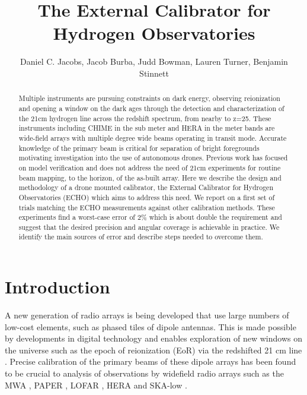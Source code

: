 \documentclass[preprint2,numberedappendix,tighten,twocolappendix]{aastex6}
\begin{document}
\title{The External Calibrator for Hydrogen Observatories}



\author{
Daniel C. Jacobs,
Jacob Burba,
Judd Bowman,
Lauren Turner,
Benjamin Stinnett
}



\begin{abstract}
Multiple instruments are pursuing constraints on dark energy, observing reionization and opening a window on the dark ages through the detection and characterization of the 21cm hydrogen line across the redshift spectrum, from nearby to z=25.  These instruments including CHIME in the sub meter and HERA in the meter bands are wide-field arrays with multiple degree wide beams operating in transit mode.  Accurate knowledge of the primary beam is critical for separation of bright foregrounds motivating investigation into the use of autonomous drones.  Previous work has focused on model verification and does not address the need of 21cm experiments for routine beam mapping, to the horizon, of the as-built array.  Here we describe the design and methodology of a drone mounted calibrator, the External Calibrator for Hydrogen Observatories (ECHO) which aims to address this need. We report on a first set of trials matching the ECHO measurements against other calibration methods.  These experiments find a worst-case error of 2\% which is about double the requirement and suggest that the desired precision and angular coverage is achievable in practice. We identify the main sources of error and describe steps needed to overcome them.
\end{abstract}




\section{Introduction}\label{sec:intro}

A new generation of radio arrays is being developed that use large numbers of low-cost elements, such as phased tiles of dipole antennas. This is made possible by developments in digital technology and enables exploration of new windows on the universe such as the epoch of reionization (EoR) via the redshifted 21 cm line \citep{Morales:2010p8093,Furlanetto:2006p2267,Madau:1997p2232}. Precise calibration of the primary beams of these dipole arrays has been found to be crucial to analysis of observations by widefield radio arrays such as the MWA \citep{Tingay:2013p9022,Bowman:2013p9950}, PAPER \citep{Pober:2012p8800,2015ApJ...809...61A,2013ApJ...776..108J}, LOFAR \cite{Yatawatta:2013p9699}, HERA \citep{2016:deBoerHERAarxiv} and SKA-low \citep{Mellema:2013p10035,Mort:2016SKAlowimagingarxiv}.
\end{document}
